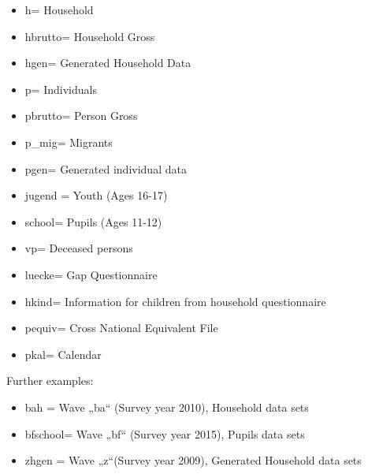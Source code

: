 \documentclass[letterpaper,10pt,openany,onesideH,english]{sphinxmanual}
\begin{document}
\begin{itemize}
\item {} 
h= Household

\item {} 
hbrutto= Household Gross

\item {} 
hgen= Generated Household Data

\item {} 
p= Individuals

\item {} 
pbrutto= Person Gross

\item {} 
p\_mig= Migrants

\item {} 
pgen= Generated individual data

\item {} 
jugend = Youth (Ages 16-17)

\item {} 
school= Pupils (Ages 11-12)

\item {} 
vp= Deceased persons

\item {} 
luecke= Gap Questionnaire

\item {} 
hkind= Information for children from household questionnaire

\item {} 
pequiv= Cross National Equivalent File

\item {} 
pkal= Calendar

\end{itemize}

Further examples:
\begin{itemize}
\item {} 
bah = Wave „ba“ (Survey year 2010), Household data sets

\item {} 
bfschool= Wave „bf“ (Survey year 2015), Pupils data sets

\item {} 
zhgen = Wave „z“(Survey year 2009), Generated Household data sets

\end{itemize}
\end{document}
